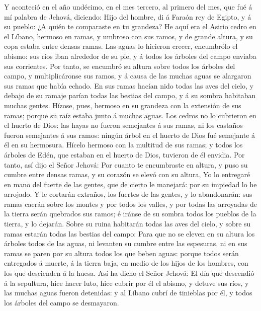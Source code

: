  Y aconteció en el año undécimo, en el mes tercero, al
primero del mes, que fué á mí palabra de Jehová, diciendo: 
Hijo del hombre, di á Faraón rey de Egipto, y á su pueblo: ¿A quién te
comparaste en tu grandeza?  He aquí era el Asirio cedro en
el Líbano, hermoso en ramas, y umbroso con sus ramos, y de grande
altura, y su copa estaba entre densas ramas.  Las aguas lo
hicieron crecer, encumbrólo el abismo: sus ríos iban alrededor de su
pie, y á todos los árboles del campo enviaba sus corrientes.
 Por tanto, se encumbró su altura sobre todos los árboles
del campo, y multiplicáronse sus ramos, y á causa de las muchas aguas se
alargaron sus ramas que había echado.  En sus ramas hacían
nido todas las aves del cielo, y debajo de su ramaje parían todas las
bestias del campo, y á su sombra habitaban muchas gentes. 
Hízose, pues, hermoso en su grandeza con la extensión de sus ramas;
porque su raíz estaba junto á muchas aguas.  Los cedros no
lo cubrieron en el huerto de Dios: las hayas no fueron semejantes á sus
ramas, ni los castaños fueron semejantes á sus ramos: ningún árbol en el
huerto de Dios fué semejante á él en su hermosura.  Hícelo
hermoso con la multitud de sus ramas; y todos los árboles de Edén, que
estaban en el huerto de Dios, tuvieron de él envidia.  Por
tanto, así dijo el Señor Jehová: Por cuanto te encumbraste en altura, y
puso su cumbre entre densas ramas, y su corazón se elevó con su altura,
 Yo lo entregaré en mano del fuerte de las gentes, que de
cierto le manejará: por su impiedad lo he arrojado.  Y le
cortarán extraños, los fuertes de las gentes, y lo abandonarán: sus
ramas caerán sobre los montes y por todos los valles, y por todas las
arroyadas de la tierra serán quebrados sus ramos; é iránse de su sombra
todos los pueblos de la tierra, y lo dejarán.  Sobre su
ruina habitarán todas las aves del cielo, y sobre su ramas estarán todas
las bestias del campo:  Para que no se eleven en su altura
los árboles todos de las aguas, ni levanten su cumbre entre las
espesuras, ni en sus ramas se paren por su altura todos los que beben
aguas: porque todos serán entregados á muerte, á la tierra baja, en
medio de los hijos de los hombres, con los que descienden á la huesa.
 Así ha dicho el Señor Jehová: El día que descendió á la
sepultura, hice hacer luto, hice cubrir por él el abismo, y detuve sus
ríos, y las muchas aguas fueron detenidas: y al Líbano cubrí de
tinieblas por él, y todos los árboles del campo se desmayaron.
